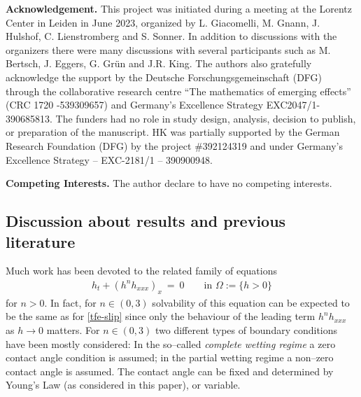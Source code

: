 \documentclass[pagesize,pdftex]{amsart}
\newcommand{\Ome}{\Omega}
\begin{document}
\medskip

  

\textbf{Acknowledgement.} This project was initiated during a meeting at the
Lorentz Center in Leiden in June 2023, organized by L. Giacomelli, M. Gnann,
J. Hulshof, C. Lienstromberg and S. Sonner.  In addition to discussions with the organizers
there were many discussions with several participants such as M. Bertsch,
J. Eggers, G. Grün and J.R. King. The authors also gratefully acknowledge the
support by the Deutsche Forschungsgemeinschaft (DFG) through the collaborative
research centre ``The mathematics of emerging effects'' (CRC 1720 -539309657)
and Germany's Excellence Strategy EXC2047/1-390685813. The funders had no role
in study design, analysis, decision to publish, or preparation of the
manuscript.  HK was partially supported by the German Research Foundation (DFG)
by the project \#392124319 and under Germany's Excellence Strategy – EXC-2181/1
– 390900948.

\medskip

\textbf{Competing Interests.} The author declare to have no competing
interests.


\subsection{Discussion about results and previous literature}

Much work has been  devoted to the related family of equations
\begin{align}
  h_t +(h^n h_{xxx})_x\ = \ 0\qquad \text{in $\Ome := \{h>0\}$}  \label{tfe-n}
\end{align}%
for $n > 0$. In fact, for $n \in (0,3)$ solvability of this equation can be
expected to be the same as for \eqref{tfe-slip} since only the behaviour of the
leading term $h^n h_{xxx}$ as $h\to 0$ matters. For $n \in (0,3)$ two different
types of boundary conditions have been mostly considered: In the so--called
\textit{complete wetting regime} a zero contact angle condition is assumed; in
the partial wetting regime a non--zero contact angle is assumed. The contact
angle can be fixed and determined by Young's Law (as considered in this paper),
or variable.
\end{document}
